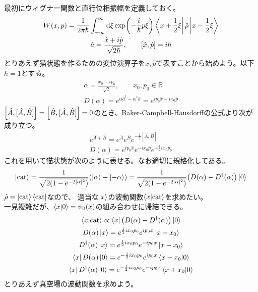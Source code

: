 \documentclass{jsarticle}
\begin{document}
最初にウィグナー関数と直行位相振幅を定義しておく。
\begin{gather*}
	W(x,p) = \frac{1}{2\pi \hbar} \int^{\infty}_{-\infty} \dd \xi \exp(-\frac{i}{\hbar}p\xi) \bra{x+ \frac{1}{2}\xi} \hat{\rho} \ket{x - \frac{1}{2}\xi}\\
	\hat{a} = \frac{\hat{x} + i \hat{p}}{\sqrt{2\hbar}}  , \qquad [\hat{x}, \hat{p}] = i\hbar
\end{gather*}
とりあえず猫状態を作るための変位演算子を$\hat{x},\hat{p}$で表すことから始めよう。以下$\hbar = 1$とする。
\begin{gather*}
	\alpha = \frac{x_0 + ip_0}{\sqrt{2}} ,\qquad x_0, p_0 \in \mathbb{R} \\
	D(\alpha) = e^{\alpha \hat{a}^\dagger - \alpha^* \hat{a}} = e^{i p_0 \hat{x} - i x_0 \hat{p}}
\end{gather*}
$\qty[\hat{A},[\hat{A},\hat{B}]]= \qty[\hat{B},[\hat{A},\hat{B}]]=0$のとき、Baker-Campbell-Hausdorffの公式より次が成り立つ。
\begin{gather*}
	e^{\hat{A} + \hat{B}}	=	e^{\hat{A}} e^{\hat{B}} e^{-\frac{1}{2}[\hat{A}, \hat{B}]}\\
	D(\alpha) = e^{ip_0 \hat{x}} e^{-ix_0 \hat{p}} e^{-\frac{1}{2} i x_0 p_0}
\end{gather*}
これを用いて猫状態が次のように表せる。なお適切に規格化してある。
\begin{gather*}
	\ket{\text{cat}} = \frac{1}{\sqrt{2(1-e^{-2|\alpha|^2})}} \qty(\ket{\alpha} - \ket{-\alpha} ) =\frac{1}{\sqrt{2(1-e^{-2|\alpha|^2})}}  \qty( D(\alpha) - D^\dagger(\alpha) )\ket{0}
\end{gather*}
$\hat{\rho} = \ket{\text{cat}} \bra{\text{cat}}$なので、
適当な$\ket{x}$の波動関数$\braket{x}{\text{cat}}$を求めたい。\\
一見複雑だが、$\braket{x}{0} = \psi_0 (x)$の組み合わせに帰結できる。
\begin{gather*}
	\braket{x}{\text{cat}} \propto \bra{x} \qty( D(\alpha) - D^\dagger(\alpha) ) \ket{0}\\
	D(\alpha) \ket{x}= e^{\frac{1}{2}i x_0 p_0} e^{ip_0 x} \ket{x + x_0}\\
	D^\dagger(\alpha) \ket{x} = e^{\frac{1}{2} i x_0 p_0} e^{-i p_0 x} \ket{x - x_0}\\
	\bra{x} D(\alpha) \ket{0} = e^{-\frac{1}{2} i x_0 p_0} e^{ip_0 x} \braket{x-x_0}{0}\\
	\bra{x} D^\dagger(\alpha) \ket{0} = e^{-\frac{1}{2} i x_0 p_0} e^{-ip_0 x} \braket{x+x_0}{0}
\end{gather*}
とりあえず真空場の波動関数を求めよう。\\
\end{document}
